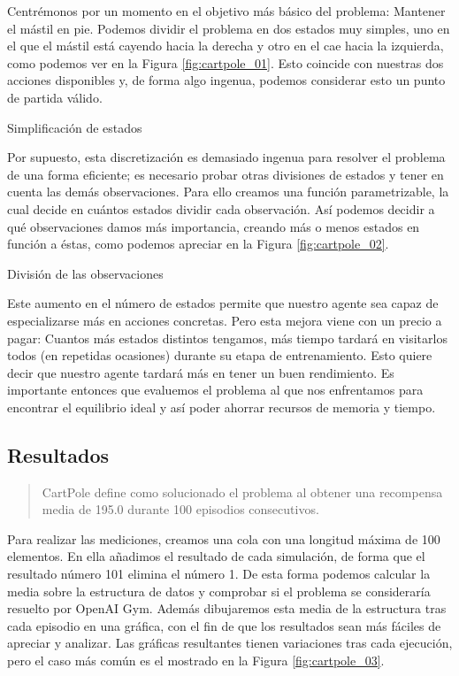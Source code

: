 Centrémonos por un momento en el objetivo más básico del problema: Mantener el mástil en pie. Podemos dividir el problema en dos estados muy simples, uno en el que el mástil está cayendo hacia la derecha y otro en el cae hacia la izquierda, como podemos ver en la Figura \ref{fig:cartpole_01}. Esto coincide con nuestras dos acciones disponibles y, de forma algo ingenua, podemos considerar esto un punto de partida válido.

%
       {Simplificación de estados}

Por supuesto, esta discretización es demasiado ingenua para resolver el problema de una forma eficiente; es necesario probar otras divisiones de estados y tener en cuenta las demás observaciones. Para ello creamos una función parametrizable, la cual decide en cuántos estados dividir cada observación. Así podemos decidir a qué observaciones damos más importancia, creando más o menos estados en función a éstas, como podemos apreciar en la Figura \ref{fig:cartpole_02}.

%
       {División de las observaciones}

Este aumento en el número de estados permite que nuestro agente sea capaz de especializarse más en acciones concretas. Pero esta mejora viene con un precio a pagar: Cuantos más estados distintos tengamos, más tiempo tardará en visitarlos todos (en repetidas ocasiones) durante su etapa de entrenamiento. Esto quiere decir que nuestro agente tardará más en tener un buen rendimiento. Es importante entonces que evaluemos el problema al que nos enfrentamos para encontrar el equilibrio ideal y así poder ahorrar recursos de memoria y tiempo.

\subsection{Resultados}
\begin{quote}
    CartPole define como solucionado el problema al obtener una recompensa media de 195.0 durante 100 episodios consecutivos.
\end{quote}

Para realizar las mediciones, creamos una cola con una longitud máxima de 100 elementos. En ella añadimos el resultado de cada simulación, de forma que el resultado número 101 elimina el número 1. De esta forma podemos calcular la media sobre la estructura de datos y comprobar si el problema se consideraría resuelto por OpenAI Gym. Además dibujaremos esta media de la estructura tras cada episodio en una gráfica, con el fin de que los resultados sean más fáciles de apreciar y analizar. Las gráficas resultantes tienen variaciones tras cada ejecución, pero el caso más común es el mostrado en la Figura \ref{fig:cartpole_03}.


